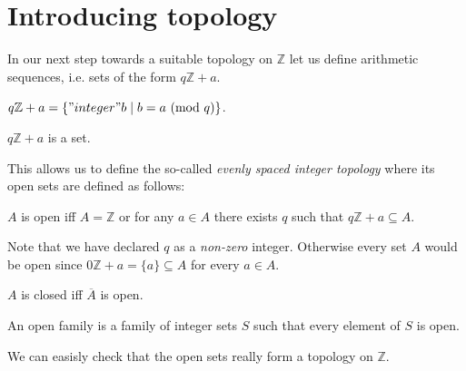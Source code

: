 \documentclass{article}
\renewcommand{\mod}{\text{mod }}
\newcommand{\Int}{\mathbb{Z}}
\begin{document}
  \section{Introducing topology}

  In our next step towards a suitable topology on $\Int$ let us define arithmetic sequences, i.e. sets of the form $q \Int + a$.

  \begin{forthel}
    \begin{definition}[ArSeq]
      $q \Int + a = \{ "integer" b \mid b = a ~(\mod q) \}$.
    \end{definition}

    \begin{lemma}
      $q \Int + a$ is a set.
    \end{lemma}
  \end{forthel}

  This allows us to define the so-called \textit{evenly spaced integer topology} where its open sets are defined as follows:

  \begin{forthel}
    \begin{definition}[Open]
      $A$ is open iff $A = \Int$ or for any $a \in A$ there exists $q$ such that $q \Int + a \subseteq A$.
    \end{definition}
  \end{forthel}

  Note that we have declared $q$ as a \textit{non-zero} integer. Otherwise every set $A$ would be open since $0 \Int + a = \{ a \} \subseteq A$ for every $a \in A$.

  \begin{forthel}
    \begin{definition}[Closed]
      $A$ is closed iff $\overline{A}$ is open.
    \end{definition}

    \begin{definition}[OpenIntegerSets]
      An open family is a family of integer sets $S$ such that every element of $S$ is open.
    \end{definition}
  \end{forthel}

  We can easisly check that the open sets really form a topology on $\Int$.
\end{document}

